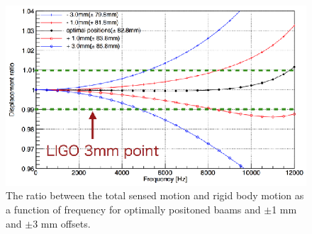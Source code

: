 \begin{figure}
\begin{center}
\includegraphics[width=14cm]{Figures/edeform.eps}
\caption{The ratio between the total sensed motion and rigid body motion 
as a function of frequency for optimally positoned baams and 
$\pm$1 mm and $\pm$3 mm offsets.} 
\label{fig:edeform} 
\end{center}
\end{figure}

